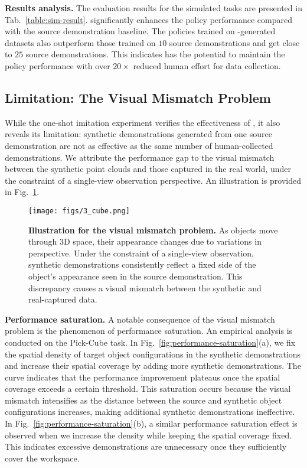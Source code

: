 \vspace{0.2cm} \noindent\textbf{Results analysis.}
The evaluation results for the simulated tasks are presented in Tab.~\ref{table:sim-result}. \method significantly enhances the policy performance compared with the source demonstration baseline. The policies trained on \method-generated datasets also outperform those trained on $10$ source demonstrations and get close to $25$ source demonstrations. This indicates \method has the potential to maintain the policy performance with over $20\times$ reduced human effort for data collection. 


\subsection{Limitation: The Visual Mismatch Problem}
\label{sec:visual-mismatch}
While the one-shot imitation experiment verifies the effectiveness of \method, it also reveals its limitation: synthetic demonstrations generated from one source demonstration are not as effective as the same number of human-collected demonstrations. We attribute the performance gap to the visual mismatch between the synthetic point clouds and those captured in the real world, under the constraint of a single-view observation perspective. An illustration is provided in Fig.~\ref{fig:visual-mismatch}. 

\begin{figure}
    \vspace{-0.4cm}
    \centering
    \texttt{[image: figs/3\_cube.png]}
    \vspace{-0.5cm}
    \caption{\textbf{Illustration for the visual mismatch problem.} As objects move through 3D space, their appearance changes due to variations in perspective. Under the constraint of a single-view observation, synthetic demonstrations consistently reflect a fixed side of the object's appearance seen in the source demonstration. This discrepancy causes a visual mismatch between the synthetic and real-captured data.}
    \label{fig:visual-mismatch}
\end{figure}



\vspace{0.2cm} \noindent\textbf{Performance saturation.} A notable consequence of the visual mismatch problem is the phenomenon of performance saturation. 
An empirical analysis is conducted on the Pick-Cube task. 
In Fig.~\ref{fig:performance-saturation}(a), we fix the spatial density of target object configurations in the synthetic demonstrations and increase their spatial coverage by adding more synthetic demonstrations.
The curve indicates that the performance improvement plateaus once the spatial coverage exceeds a certain threshold. This saturation occurs because the visual mismatch intensifies as the distance between the source and synthetic object configurations increases, making additional synthetic demonstrations ineffective.
In Fig.~\ref{fig:performance-saturation}(b), a similar performance saturation effect is observed when we increase the density while keeping the spatial coverage fixed. This indicates excessive demonstrations are unnecessary once they sufficiently cover the workspace.


